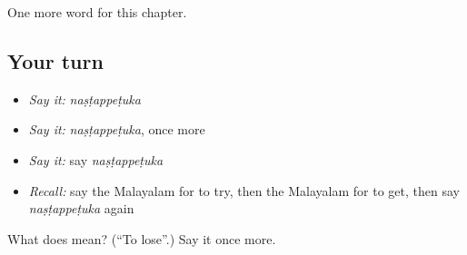\begin{grammarlens}[title={What you've built}]
One more word for this chapter.
\end{grammarlens}

\subsection*{Your turn}
\begin{itemize}
\raggedright
  \item \emph{Say it:} \emph{naṣṭappeṭuka}
  \item \emph{Say it:} \emph{naṣṭappeṭuka}, once more
  \item \emph{Say it:} say \emph{naṣṭappeṭuka}
  \item \emph{Recall:} say the Malayalam for to try, then the Malayalam for to get, then say \emph{naṣṭappeṭuka} again
\end{itemize}

\begin{tcolorbox}[breakable,colback=teal!4,colframe=teal!35!black,title={Before you move on}]
What does  mean? (\textquotedblleft{}To lose\textquotedblright{}.) Say it once more.
\end{tcolorbox}
